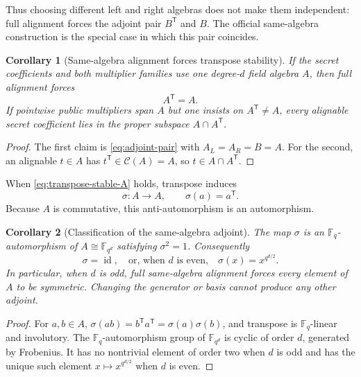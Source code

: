 \documentclass[11pt]{article}
\newtheorem{corollary}[corollary]{Corollary}
\newcommand{\F}{\mathbb F}
\newcommand{\transpose}{\mathsf T}
\begin{document}
Thus choosing different left and right algebras does not make them
independent: full alignment forces the adjoint pair $B^\transpose$ and $B$.
The official same-algebra construction is the special case in which this pair
coincides.

\begin{corollary}[Same-algebra alignment forces transpose stability]
\label{cor:normalizer-alignment}
If the secret coefficients and both multiplier families use one degree-$d$
field algebra $A$, then full alignment forces
\begin{equation}
 A^\transpose=A.                                    \label{eq:transpose-stable-A}
\end{equation}
If pointwise public multipliers span $A$ but one insists on
$A^\transpose\ne A$, every alignable secret coefficient lies in the proper
subspace $A\cap A^\transpose$.
\end{corollary}

\begin{proof}
The first claim is \eqref{eq:adjoint-pair} with $A_L=A_R=B=A$.  For the
second, an alignable $t\in A$ has
$t^\transpose\in\mathcal C(A)=A$, so
$t\in A\cap A^\transpose$.
\end{proof}

When \eqref{eq:transpose-stable-A} holds, transpose induces
\[
 \sigma:A\longrightarrow A,
 \qquad \sigma(a)=a^\transpose.
\]
Because $A$ is commutative, this anti-automorphism is an automorphism.

\begin{corollary}[Classification of the same-algebra adjoint]
\label{cor:alignment-adjoint-classification}
The map $\sigma$ is an $\F_q$-automorphism of
$A\cong\F_{q^d}$ satisfying $\sigma^2=1$.  Consequently
\[
 \sigma=\operatorname{id},
 \quad\text{or, when $d$ is even,}\quad
 \sigma(x)=x^{q^{d/2}}.
\]
In particular, when $d$ is odd, full same-algebra alignment forces every
element of $A$ to be symmetric.  Changing the generator or basis cannot
produce any other adjoint.
\end{corollary}

\begin{proof}
For $a,b\in A$,
$\sigma(ab)=b^\transpose a^\transpose=\sigma(a)\sigma(b)$, and transpose is
$\F_q$-linear and involutory.  The $\F_q$-automorphism group of
$\F_{q^d}$ is cyclic of order $d$, generated by Frobenius.  It has no
nontrivial element of order two when $d$ is odd and has the unique such
element $x\mapsto x^{q^{d/2}}$ when $d$ is even.
\end{proof}
\end{document}
